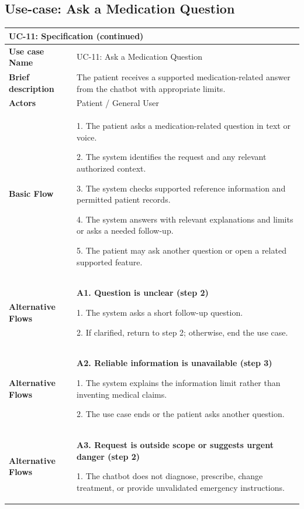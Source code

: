 
\clearpage
\subsection{Use-case: Ask a Medication Question}
\label{uc:uc-11}

\begin{longtable}{|p{}|p{}|}
\hline
\endfirsthead
\multicolumn{2}{l}{\textbf{UC-11: Specification (continued)}} \\
\hline
\endhead
\textbf{Use case Name} & UC-11: Ask a Medication Question \\ \hline
\textbf{Brief description} & The patient receives a supported medication-related answer from the chatbot with appropriate limits. \\ \hline
\textbf{Actors} & Patient / General User \\ \hline
\textbf{Basic Flow} &
1. The patient asks a medication-related question in text or voice.\par
2. The system identifies the request and any relevant authorized context.\par
3. The system checks supported reference information and permitted patient records.\par
4. The system answers with relevant explanations and limits or asks a needed follow-up.\par
5. The patient may ask another question or open a related supported feature.
\\ \hline
\textbf{Alternative Flows} &
\textbf{A1. Question is unclear (step 2)}\par
1. The system asks a short follow-up question.\par
2. If clarified, return to step 2; otherwise, end the use case.
\\ \hline
\textbf{Alternative Flows} &
\textbf{A2. Reliable information is unavailable (step 3)}\par
1. The system explains the information limit rather than inventing medical claims.\par
2. The use case ends or the patient asks another question.
\\ \hline
\textbf{Alternative Flows} &
\textbf{A3. Request is outside scope or suggests urgent danger (step 2)}\par
1. The chatbot does not diagnose, prescribe, change treatment, or provide unvalidated emergency instructions.\par

\end{longtable}
